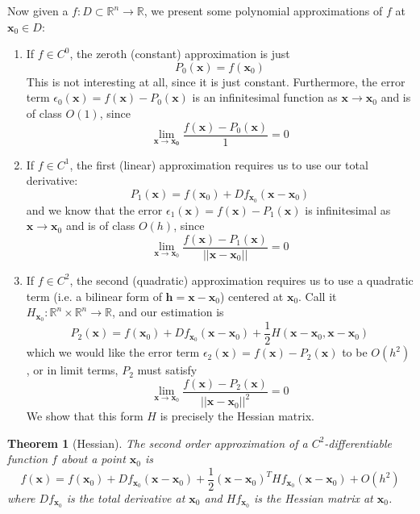 \documentclass{article}
\newtheorem{theorem}{Theorem}[section]
\theoremstyle{remark}
\theoremstyle{definition}
\begin{document}
Now given a $f: D \subset \mathbb{R}^n \longrightarrow \mathbb{R}$, we present some polynomial approximations of $f$ at $\mathbf{x}_0 \in D$: 
\begin{enumerate}
    \item If $f \in C^0$, the zeroth (constant) approximation is just 
    \[P_0 (\mathbf{x}) = f(\mathbf{x}_0)\]
    This is not interesting at all, since it is just constant. Furthermore, the error term $\epsilon_0 (\mathbf{x}) = f(\mathbf{x}) - P_0 (\mathbf{x})$ is an infinitesimal function as $\mathbf{x} \rightarrow \mathbf{x}_0$ and is of class $O(1)$, since 
    \[\lim_{\mathbf{x} \rightarrow \mathbf{x_0}} \frac{f(\mathbf{x}) - P_0 (\mathbf{x})}{1} = 0\]
    
    \item If $f \in C^1$, the first (linear) approximation requires us to use our total derivative: 
    \[P_1 (\mathbf{x}) = f(\mathbf{x}_0) + D f_{\mathbf{x}_0} (\mathbf{x} - \mathbf{x}_0)\]
    and we know that the error $\epsilon_1 (\mathbf{x}) = f(\mathbf{x}) - P_1 (\mathbf{x})$ is infinitesimal as $\mathbf{x} \rightarrow \mathbf{x}_0$ and is of class $O(h)$, since 
    \[\lim_{\mathbf{x} \rightarrow \mathbf{x}_0} \frac{f(\mathbf{x}) - P_1(\mathbf{x})}{||\mathbf{x} - \mathbf{x}_0||} = 0\]
    
    \item If $f \in C^2$, the second (quadratic) approximation requires us to use a quadratic term (i.e. a bilinear form of $\mathbf{h} = \mathbf{x} - \mathbf{x}_0$) centered at $\mathbf{x}_0$. Call it $H_{\mathbf{x}_0}: \mathbb{R}^n \times \mathbb{R}^n \longrightarrow \mathbb{R}$, and our estimation is 
    \[P_2 (\mathbf{x}) = f(\mathbf{x}_0) + D f_{\mathbf{x}_0} (\mathbf{x} - \mathbf{x}_0) + \frac{1}{2} H (\mathbf{x} - \mathbf{x}_0, \mathbf{x} - \mathbf{x}_0)\]
    which we would like the error term $\epsilon_2 (\mathbf{x}) = f(\mathbf{x}) - P_2 (\mathbf{x})$ to be $O(h^2)$, or in limit terms, $P_2$ must satisfy 
    \[\lim_{\mathbf{x} \rightarrow \mathbf{x}_0} \frac{f(\mathbf{x}) - P_2 (\mathbf{x})}{||\mathbf{x} - \mathbf{x}_0||^2} = 0\]
    We show that this form $H$ is precisely the Hessian matrix. 
\end{enumerate}

\begin{theorem}[Hessian]
The second order approximation of a $C^2$-differentiable function $f$ about a point $\mathbf{x}_0$ is 
\[f (\mathbf{x}) = f(\mathbf{x}_0) + D f_{\mathbf{x}_0} (\mathbf{x} - \mathbf{x}_0) + \frac{1}{2} (\mathbf{x} - \mathbf{x}_0)^T H f_{\mathbf{x}_0} (\mathbf{x} - \mathbf{x}_0) + O(h^2)\]
where $D f_{\mathbf{x}_0}$ is the total derivative at $\mathbf{x}_0$ and $H f_{\mathbf{x}_0}$ is the Hessian matrix at $\mathbf{x}_0$. 
\end{theorem}
\end{document}
